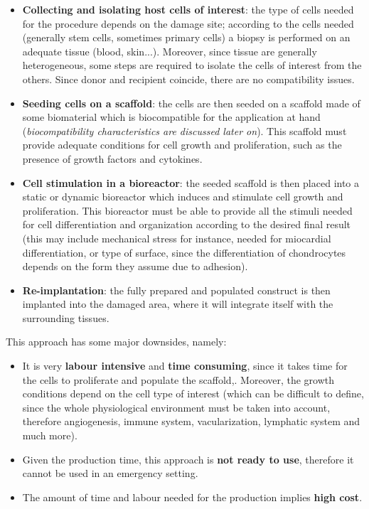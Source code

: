   \begin{multicols}{2}
    \begin{itemize}
      \item \textbf{Collecting and isolating host cells of interest}: the type of cells needed for the procedure depends on the damage site; according to the cells needed (generally stem cells, sometimes primary cells) a biopsy is performed on an adequate tissue (blood, skin...).
        Moreover, since tissue are generally heterogeneous, some steps are required to isolate the cells of interest from the others.
        Since donor and recipient coincide, there are no compatibility issues.
      \item \textbf{Seeding cells on a scaffold}: the cells are then seeded on a scaffold made of some biomaterial which is biocompatible for the application at hand (\textit{biocompatibility characteristics are discussed later on}).
        This scaffold must provide adequate conditions for cell growth and proliferation, such as the presence of growth factors and cytokines.
      \item \textbf{Cell stimulation in a bioreactor}: the seeded scaffold is then placed into a static or dynamic bioreactor which induces and stimulate cell growth and proliferation.
        This bioreactor must be able to provide all the stimuli needed for cell differentiation and organization according to the desired final result (this may include mechanical stress for instance, needed for miocardial differentiation, or type of surface, since the differentiation of chondrocytes depends on the form they assume due to adhesion).
      \item \textbf{Re-implantation}: the fully prepared and populated construct is then implanted into the damaged area, where it will integrate itself with the surrounding tissues.
    \end{itemize}
  \end{multicols}

  This approach has some major downsides, namely:

  \begin{multicols}{2}
    \begin{itemize}
      \item It is very \textbf{labour intensive} and \textbf{time consuming}, since it takes time for the cells to proliferate and populate the scaffold,. Moreover, the growth conditions depend on the cell type of interest (which can be difficult to define, since the whole physiological environment must be taken into account, therefore angiogenesis, immune system, vacularization, lymphatic system and much more).
      \item Given the production time, this approach is \textbf{not ready to use}, therefore it cannot be used in an emergency setting.
      \item The amount of time and labour needed for the production implies \textbf{high cost}.
    \end{itemize}
  \end{multicols}

